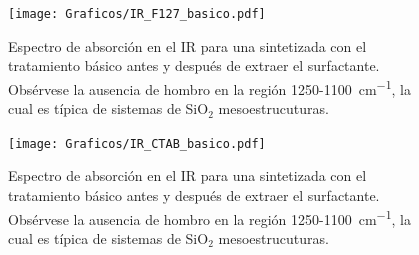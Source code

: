 			\begin{figure}
			\centering
			\texttt{[image: Graficos/IR\_F127\_basico.pdf]}
			\caption[FTIR \pdmF\space tratamiento básico.]{Espectro de absorción en el IR para una \pdmF\space sintetizada con el tratamiento básico antes y después de extraer el surfactante. Obsérvese la ausencia de hombro en la región 1250-\SI{1100}{\cm^{-1}}, la cual es típica de sistemas de SiO$_2$ mesoestrucuturas.}
			\label{fig:IR_F127_basico}
			\end{figure}


			\begin{figure}
			\centering
			\texttt{[image: Graficos/IR\_CTAB\_basico.pdf]}
			\caption[FTIR \pdmC\space tratamiento básico.]{Espectro de absorción en el IR para una \pdmC\space sintetizada con el tratamiento básico antes y después de extraer el surfactante. Obsérvese la ausencia de hombro en la región 1250-\SI{1100}{\cm^{-1}}, la cual es típica de sistemas de SiO$_2$ mesoestrucuturas.}
			\label{fig:IR_CTAB_basico}
		    \end{figure}
		\null
		\vfill		

\let\thispagestyle=\originalstyle